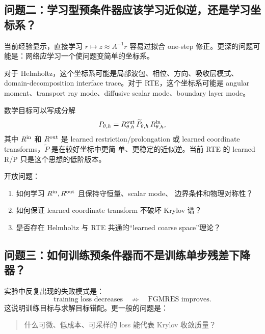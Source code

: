 \documentclass[UTF8,11pt,fontset=fandol]{ctexart}
\begin{document}
\subsection{问题二：学习型预条件器应该学习近似逆，还是学习坐标系？}

当前经验显示，直接学习 \(r\mapsto z\approx A^{-1}r\) 容易过拟合 one-step
修正。更深的问题可能是：网络应学习一个使问题变简单的坐标系。

对于 Helmholtz，这个坐标系可能是局部波包、相位、方向、吸收层模式、
domain-decomposition interface trace。对于 RTE，这个坐标系可能是
angular moment、transport ray mode、diffusive scalar mode、boundary
layer mode。

数学目标可以写成分解
\begin{equation}
  P_{\theta,h}
  =
  R_{\theta,h}^{\rm out}
  \, \widetilde P_{\theta,h}
  \, R_{\theta,h}^{\rm in},
\end{equation}
其中 \(R^{\rm in}\) 和 \(R^{\rm out}\) 是 learned restriction/prolongation
或 learned coordinate transforms，\(\widetilde P\) 是在较好坐标中更简
单、更稳定的近似逆。当前 RTE 的 learned R/P 只是这个思想的低阶版本。

开放问题：
\begin{enumerate}[leftmargin=2em]
  \item 如何学习 \(R^{\rm in},R^{\rm out}\) 且保持守恒量、scalar mode、
  边界条件和物理对称性？
  \item 如何保证 learned coordinate transform 不破坏 Krylov 谱？
  \item 是否存在 Helmholtz 与 RTE 共通的“learned coarse space”理论？
\end{enumerate}

\subsection{问题三：如何训练预条件器而不是训练单步残差下降器？}

实验中反复出现的失败模式是：
\[
  \text{training loss decreases}
  \quad\not\Rightarrow\quad
  \text{FGMRES improves}.
\]
这说明训练目标与求解目标错配。更一般的问题是：
\begin{quote}
  什么可微、低成本、可采样的 loss 能代表 Krylov 收敛质量？
\end{quote}
\end{document}
